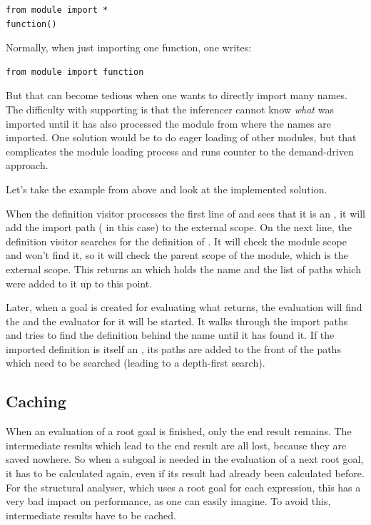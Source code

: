 \documentclass[12pt,halfparskip,DIV11,BCOR10mm]{scrreprt}
\begin{document}
\begin{lstlisting}
from module import *
function()
\end{lstlisting}

Normally, when just importing one function, one writes:

\begin{lstlisting}
from module import function
\end{lstlisting}

But that can become tedious when one wants to directly import many names. The difficulty with supporting  is that the inferencer cannot know \emph{what} was imported until it has also processed the module from where the names are imported. One solution would be to do eager loading of other modules, but that complicates the module loading process and runs counter to the demand-driven approach.

Let's take the example from above and look at the implemented solution.

When the definition visitor processes the first line of  and sees that it is an , it will add the import path ( in this case) to the external scope. On the next line, the definition visitor searches for the definition of . It will check the module scope and won't find it, so it will check the parent scope of the module, which is the external scope. This returns an  which holds the name and the list of  paths which were added to it up to this point.

Later, when a goal is created for evaluating what  returns, the evaluation will find the  and the evaluator for it will be started. It walks through the import paths and tries to find the definition behind the name  until it has found it. If the imported definition is itself an , its paths are added to the front of the paths which need to be searched (leading to a depth-first search).


\subsection{Caching}

When an evaluation of a root goal is finished, only the end result remains. The intermediate results which lead to the end result are all lost, because they are saved nowhere. So when a subgoal is needed in the evaluation of a next root goal, it has to be calculated again, even if its result had already been calculated before. For the structural analyser, which uses a root goal for each expression, this has a very bad impact on performance, as one can easily imagine. To avoid this, intermediate results have to be cached.
\end{document}
